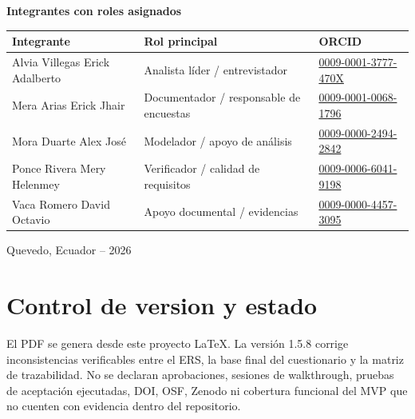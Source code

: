 \documentclass[11pt,a4paper,twoside]{article}
\begin{document}
\begin{titlepage}
\vspace{0.28cm}
{\normalsize\bfseries Integrantes con roles asignados\par}
\vspace{0.12cm}
\begin{tabularx}{\textwidth}{|X|X|p{4.1cm}|}\hline
\textbf{Integrante} & \textbf{Rol principal} & \textbf{ORCID}\\\hline
Alvia Villegas Erick Adalberto & Analista líder / entrevistador & \href{https://orcid.org/0009-0001-3777-470X}{0009-0001-3777-470X}\\\hline
Mera Arias Erick Jhair & Documentador / responsable de encuestas & \href{https://orcid.org/0009-0001-0068-1796}{0009-0001-0068-1796}\\\hline
Mora Duarte Alex José & Modelador / apoyo de análisis & \href{https://orcid.org/0009-0000-2494-2842}{0009-0000-2494-2842}\\\hline
Ponce Rivera Mery Helenmey & Verificador / calidad de requisitos & \href{https://orcid.org/0009-0006-6041-9198}{0009-0006-6041-9198}\\\hline
Vaca Romero David Octavio & Apoyo documental / evidencias & \href{https://orcid.org/0009-0000-4457-3095}{0009-0000-4457-3095}\\\hline
\end{tabularx}
\vfill
\normalsize Quevedo, Ecuador -- 2026
\end{titlepage}
\tableofcontents
\listoffigures
\newpage

\section{Control de version y estado}
El PDF se genera desde este proyecto LaTeX. La versión 1.5.8 corrige inconsistencias verificables entre el ERS, la base final del cuestionario y la matriz de trazabilidad. No se declaran aprobaciones, sesiones de walkthrough, pruebas de aceptación ejecutadas, DOI, OSF, Zenodo ni cobertura funcional del MVP que no cuenten con evidencia dentro del repositorio.
\end{document}
